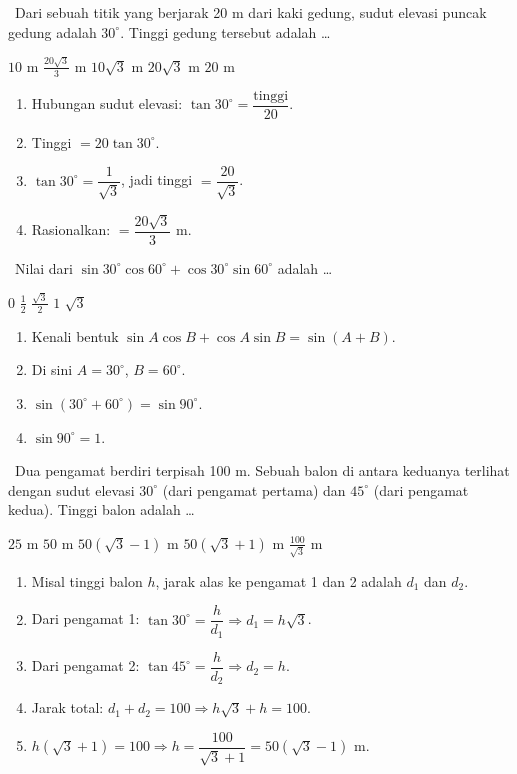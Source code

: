 \documentclass[11pt,a4paper]{exam}
\newenvironment{langkah}{%
  \begin{enumerate}[label=\textbf{Langkah \arabic*:},leftmargin=2.6em,
    itemsep=2pt,topsep=2pt]}{\end{enumerate}}
\newcommand{\Adv}{{\footnotesize\textsf{\textcolor{oranye}{[Advanced]}}}\ }
\newcommand{\Exp}{{\footnotesize\textsf{\textcolor{ungu}{[Expert]}}}\ }
\begin{document}
\begin{questions}
\question \Adv Dari sebuah titik yang berjarak 20 m dari kaki gedung, sudut elevasi
puncak gedung adalah $30^\circ$. Tinggi gedung tersebut adalah \dots
\begin{choices}
\choice $10$ m \CorrectChoice $\tfrac{20\sqrt{3}}{3}$ m \choice $10\sqrt{3}$ m
\choice $20\sqrt{3}$ m \choice $20$ m
\end{choices}
\begin{solution}
\begin{langkah}
\item Hubungan sudut elevasi: $\tan 30^\circ = \dfrac{\text{tinggi}}{20}$.
\item Tinggi $= 20\tan 30^\circ$.
\item $\tan 30^\circ = \dfrac{1}{\sqrt3}$, jadi tinggi $= \dfrac{20}{\sqrt3}$.
\item Rasionalkan: $= \dfrac{20\sqrt3}{3}$ m.
\end{langkah}
\end{solution}

\question \Adv Nilai dari $\sin 30^\circ \cos 60^\circ + \cos 30^\circ \sin 60^\circ$ adalah \dots
\begin{choices}
\choice $0$ \choice $\tfrac{1}{2}$ \choice $\tfrac{\sqrt{3}}{2}$ \CorrectChoice $1$ \choice $\sqrt{3}$
\end{choices}
\begin{solution}
\begin{langkah}
\item Kenali bentuk $\sin A\cos B + \cos A\sin B = \sin(A+B)$.
\item Di sini $A=30^\circ$, $B=60^\circ$.
\item $\sin(30^\circ+60^\circ) = \sin 90^\circ$.
\item $\sin 90^\circ = 1$.
\end{langkah}
\end{solution}

\question \Exp Dua pengamat berdiri terpisah 100 m. Sebuah balon di antara keduanya
terlihat dengan sudut elevasi $30^\circ$ (dari pengamat pertama) dan $45^\circ$
(dari pengamat kedua). Tinggi balon adalah \dots
\begin{choices}
\choice $25$ m \choice $50$ m \CorrectChoice $50(\sqrt{3}-1)$ m
\choice $50(\sqrt{3}+1)$ m \choice $\tfrac{100}{\sqrt{3}}$ m
\end{choices}
\begin{solution}
\begin{langkah}
\item Misal tinggi balon $h$, jarak alas ke pengamat 1 dan 2 adalah $d_1$ dan $d_2$.
\item Dari pengamat 1: $\tan 30^\circ = \dfrac{h}{d_1} \Rightarrow d_1 = h\sqrt3$.
\item Dari pengamat 2: $\tan 45^\circ = \dfrac{h}{d_2} \Rightarrow d_2 = h$.
\item Jarak total: $d_1 + d_2 = 100 \Rightarrow h\sqrt3 + h = 100$.
\item $h(\sqrt3+1) = 100 \Rightarrow h = \dfrac{100}{\sqrt3+1} = 50(\sqrt3-1)$ m.
\end{langkah}
\end{solution}


\end{questions}
\end{document}
